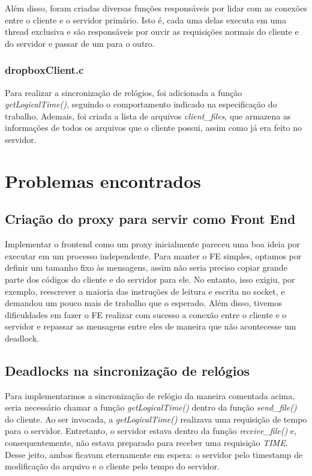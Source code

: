 \documentclass[a4paper]{article}
\begin{document}
Além disso, foram criadas diversas funções responsáveis por lidar com as conexões entre o cliente e o servidor primário. Isto é, cada uma delas executa em uma thread exclusiva e são responsáveis por ouvir as requisições normais do cliente e do servidor e passar de um para o outro. 

\subsubsection{dropboxClient.c}

Para realizar a sincronização de relógios, foi adicionada a função \textit{getLogicalTime()}, seguindo o comportamento indicado na especificação do trabalho. Ademais, foi criada a lista de arquivos \textit{client\_files}, que armazena as informações de todos os arquivos que o cliente possui, assim como já era feito no servidor.

    
\section{Problemas encontrados}
\subsection{Criação do proxy para servir como Front End}
Implementar o frontend como um proxy inicialmente pareceu uma boa ideia por executar em um processo independente. Para manter o FE simples, optamos por definir um tamanho fixo às mensagens, assim não seria preciso copiar grande parte dos códigos do cliente e do servidor para ele.  No entanto, isso exigiu, por exemplo,  reescrever a maioria das instruções de leitura e escrita no socket, e demandou um pouco mais de trabalho que o esperado. Além disso, tivemos dificuldades em fazer o FE realizar com sucesso a conexão entre o cliente e o servidor e repassar as mensagens entre eles de maneira que não acontecesse um deadlock.

\subsection{Deadlocks na sincronização de relógios}
Para implementarmos a sincronização de relógio da maneira comentada acima, seria necessário chamar a função \textit{getLogicalTime()} dentro da função \textit{send\_file()} do cliente. Ao ser invocada, a \textit{getLogicalTime()} realizava uma requisição de tempo para o servidor. Entretanto, o servidor estava dentro da função \textit{receive\_file()} e, consequentemente, não estava preparado para receber uma requisição \textit{TIME}. Desse jeito, ambos ficavam eternamente em espera: o servidor pelo timestamp de modificação do arquivo e o cliente pelo tempo do servidor.
\end{document}
